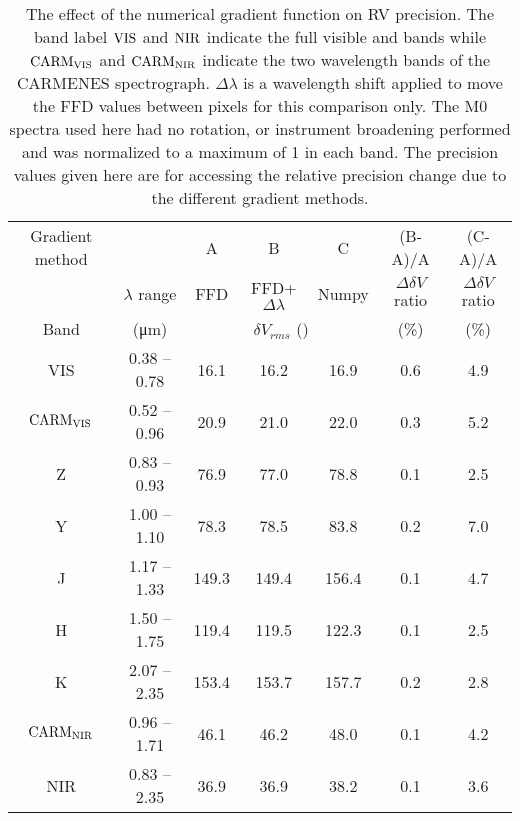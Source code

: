 
\begin{table}
    \centering
    \caption[Effect of numerial gradient.]{The effect of the numerical gradient function on {RV} precision.
        The band label \(\rm VIS\) and \(\rm NIR\) indicate the full visible and \nir{} bands while  \(\rm CARM_{VIS}\)  and \(\rm CARM_{NIR}\) indicate the two wavelength bands of the {CARMENES} spectrograph.
        \(\Delta\lambda\) is a wavelength shift applied to move the FFD values between pixels for this comparison only.
        The {M0} spectra used here had no rotation, or instrument broadening performed and was normalized to a maximum of 1 in each band.
        The precision values given here are for accessing the relative precision change due to the different gradient methods.}
    \begin{tabular}{ccccccc}
        \toprule
        Gradient method &  &  A &   B & C & (B-A)/A & (C-A)/A \\
        &   \(\lambda\) range & FFD & FFD+\(\Delta\lambda\) &  Numpy & \(\Delta\delta V\) ratio& \(\Delta\delta V\) ratio\\

        Band  & (\si{\micro\meter})  & \multicolumn{3}{c}{\(\delta V_{rms}\) (\mps{})}  & (\%) & (\%) \\
        \midrule
        VIS & 0.38 -- 0.78 & 16.1 & 16.2 & 16.9  & 0.6 & 4.9\\
        \(\rm CARM_{VIS}\) & 0.52 --  0.96 & 20.9 & 21.0 & 22.0 & 0.3 & 5.2 \\
        Z & 0.83 -- 0.93 & 76.9 & 77.0 & 78.8  & 0.1 & 2.5\\
        Y & 1.00 -- 1.10 & 78.3 & 78.5 & 83.8 & 0.2 & 7.0 \\
        J & 1.17 -- 1.33 & 149.3 & 149.4 & 156.4 & 0.1 & 4.7 \\
        H & 1.50 -- 1.75 & 119.4 & 119.5 & 122.3 & 0.1 & 2.5 \\
        K & 2.07 -- 2.35 & 153.4 & 153.7 & 157.7  & 0.2 & 2.8\\
        \(\rm CARM_{NIR}\) & 0.96 -- 1.71 & 46.1 & 46.2 & 48.0 & 0.1 & 4.2 \\
        NIR & 0.83 -- 2.35 & 36.9 & 36.9 & 38.2 & 0.1 & 3.6  \\
        \bottomrule
    \end{tabular}\label{tab:numerical_gradients}
\end{table}
